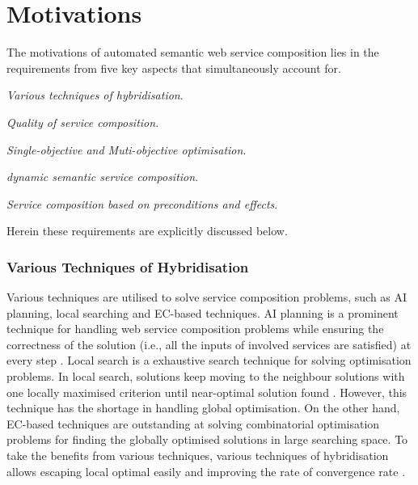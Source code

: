 \section{Motivations}
The motivations of automated semantic web service composition lies in the requirements from five key aspects that simultaneously account for. 
\begin{enumerate*}
 \item \emph{Various techniques of hybridisation}.
 \item \emph{Quality of service composition}.
 \item \emph{Single-objective and Muti-objective optimisation}.
 \item \emph{dynamic semantic service composition}.
 \item \emph{Service composition based on preconditions and effects}.
\end{enumerate*}
Herein these requirements are explicitly discussed below. 
\subsubsection{Various Techniques of Hybridisation}

Various techniques are utilised to solve service composition problems, such as AI planning, local searching and EC-based techniques. AI planning is a prominent technique for handling web service composition problems while ensuring the correctness of the solution (i.e., all the inputs of involved services are satisfied) at every step \cite{wang2014automated}.  Local search is a exhaustive search technique for solving optimisation problems. In local search, solutions keep moving to the neighbour solutions with one locally maximised criterion until near-optimal solution found \cite{parejo2008qos}. However, this technique has the shortage in handling global optimisation.  On the other hand, EC-based techniques are outstanding at solving combinatorial optimisation problems for finding the globally optimised solutions in large searching space. To take the benefits from various techniques,  various techniques of hybridisation allows escaping local optimal easily and improving the rate of convergence rate \cite{renders1996hybrid}.

